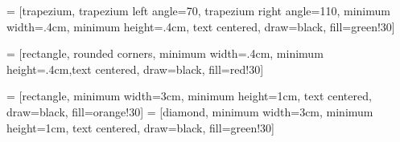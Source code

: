  = [trapezium, trapezium left angle=70, trapezium right angle=110, minimum width=.4cm, minimum height=.4cm, text centered, draw=black, fill=green!30]

 = [rectangle, rounded corners, minimum width=.4cm, minimum height=.4cm,text centered, draw=black, fill=red!30]

 = [rectangle, minimum width=3cm, minimum height=1cm, text centered, draw=black, fill=orange!30]
 = [diamond, minimum width=3cm, minimum height=1cm, text centered, draw=black, fill=green!30]

